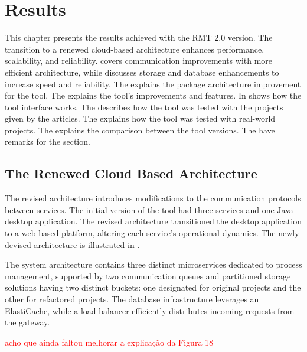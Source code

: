 \chapter{Results}
\label{results}
This chapter presents the results achieved with the RMT 2.0 version. The  transition to a renewed cloud-based architecture enhances performance, scalability, and reliability.  covers communication improvements with more efficient architecture, while  discusses storage and database enhancements to increase speed and reliability. The  explains the package architecture improvement for the tool. The  explains the tool's improvements and features. In  shows how the tool interface works. The  describes how the tool was tested with the projects given by the articles. The  explains how the tool was tested with real-world projects.
The  explains the comparison between the tool versions. The  have remarks for the section.

\section{The Renewed Cloud Based Architecture}
\label{sec-cloud}
The revised architecture introduces modifications to the communication protocols between services. The initial version of the tool had three services and one Java desktop application. The revised architecture transitioned the desktop application to a web-based platform, altering each service's operational dynamics. The newly devised architecture is illustrated in .

The system architecture contains three distinct microservices dedicated to process management, supported by two communication queues and partitioned storage solutions having two distinct buckets: one designated for original projects and the other for refactored projects. The database infrastructure leverages an ElastiCache, while a load balancer efficiently distributes incoming requests from the gateway.

\textcolor{red}{acho que ainda faltou melhorar a explicação da Figura 18}

